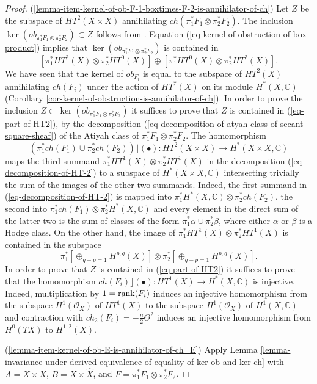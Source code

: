 \documentclass[12pt]{amsart}
\numberwithin{equation}{subsection}
\theoremstyle{plain}
\theoremstyle{definition}
\newcommand{\CC}{{\mathbb C}}
\newcommand{\StructureSheaf}[1]{{\mathcal O}_{#1}}
\newcommand{\rank}{{\rm rank}}
\newcommand{\Contract}{\rfloor}
\begin{document}
\begin{proof}
(\ref{lemma-item-kernel-of-ob-F-1-boxtimes-F-2-is-annihilator-of-ch})
Let $Z$ be the subspace of $HT^2(X\times X)$ annihilating $ch(\pi_1^*F_1\otimes\pi_2^*F_2)$.
The inclusion $\ker(ob_{\pi_1^*F_1\otimes\pi_2^*F_2})\subset Z$ follows from \cite[Theorem B]{Huang}.
Equation (\ref{eq-kernel-of-obstruction-of-box-product}) implies that $\ker(ob_{\pi_1^*F_1\otimes\pi_2^*F_2})$ is contained in 
\begin{equation}
\label{eq-part-of-HT2}
[\pi_1^*HT^2(X)\otimes \pi_2^*HT^0(X)]\oplus [\pi_1^*HT^0(X)\otimes \pi_2^*HT^2(X)].
\end{equation}
We have seen that the kernel of $ob_{F_i}$ is equal to the subspace of $HT^2(X)$ annihilating $ch(F_i)$ under the action of $HT^*(X)$ on its module $H^*(X,\CC)$ (Corollary \ref{cor-kernel-of-obstruction-is-annihilator-of-ch}). 
In order to prove the inclusion $Z\subset\ker(ob_{\pi_1^*F_1\otimes\pi_2^*F_2})$
it suffices to prove that $Z$ is contained in (\ref{eq-part-of-HT2}), by the decomposition (\ref{eq-decomposition-of-atyah-class-of-secant-square-sheaf}) of the Atiyah class of $\pi_1^*F_1\otimes\pi_2^*F_2$.
The homomorphism
\[
(\pi_1^*ch(F_1)\cup\pi_2^*ch(F_2)) \Contract (\bullet):HT^2(X\times X)\rightarrow H^*(X\times X,\CC)
\]
maps the third summand $\pi_1^*HT^1(X)\otimes\pi_2^*HT^1(X)$ in the decomposition (\ref{eq-decomposition-of-HT-2}) to a subspace of $H^*(X\times X,\CC)$ intersecting trivially the sum of the images of the other two summands.
Indeed, the first summand in (\ref{eq-decomposition-of-HT-2}) is mapped into $\pi_1^*H^*(X,\CC)\otimes\pi_2^*ch(F_2)$,
the second into $\pi_1^*ch(F_1)\otimes \pi_2^*H^*(X,\CC)$ and every element in the direct sum of the latter two 
is the sum of classes of the form $\pi_1^*\alpha\cup\pi_2^*\beta$, where either $\alpha$ or $\beta$ is a  Hodge class. 
On the other hand, the image of  $\pi_1^*HT^1(X)\otimes\pi_2^*HT^1(X)$ is contained in the subspace
\[
\pi_1^*[\oplus_{q-p=1}H^{p,q}(X)]\otimes \pi_2^*[\oplus_{q-p=1}H^{p,q}(X)].
\]
In order to prove that $Z$ is contained in (\ref{eq-part-of-HT2}) it suffices to prove that  the homomorphism 
$ch(F_i)\Contract (\bullet):HT^1(X)\rightarrow H^*(X,\CC)$ is injective. 
Indeed, multiplication by $1=\rank(F_i)$ induces an injective homomorphism from the subspace $H^1(\StructureSheaf{X})$ of $HT^1(X)$ to the subspace $H^1(\StructureSheaf{X})$ of  $H^1(X,\CC)$ and contraction with $ch_2(F_i)=-\frac{n}{2}\Theta^2$ induces an injective homomorphism from $H^0(TX)$ to $H^{1,2}(X)$.

(\ref{lemma-item-kernel-of-ob-E-is-annihilator-of-ch_E})
Apply Lemma \ref{lemma-invariance-under-derived-equivalence-of-equality-of-ker-ob-and-ker-ch} 
with $A=X\times X$, $B=X\times\hat{X}$, and $F=\pi_1^*F_1\otimes\pi_2^*F_2$.
\end{proof}
\end{document}
